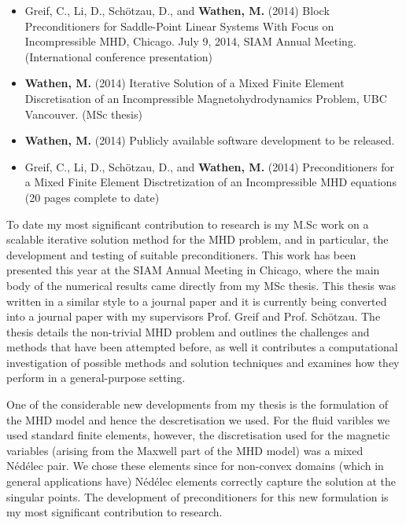 \documentclass[12pt]{article}
\numberwithin{equation}{section}    %
\newcommand{\nedelec}{N\'{e}d\'{e}lec }
\begin{document}
\medskip


\begin{itemize}
    \item Greif, C., Li, D., Sch{\"o}tzau, D., and {\bf Wathen, M.} (2014) Block Preconditioners for Saddle-Point Linear Systems With Focus on Incompressible MHD, Chicago. July 9, 2014, SIAM Annual Meeting. (International conference presentation)
    \item {\bf Wathen, M.} (2014) Iterative Solution of a Mixed Finite Element Discretisation of an Incompressible Magnetohydrodynamics Problem, UBC Vancouver. (MSc thesis)
    \item {\bf Wathen, M.} (2014) Publicly available software development to be released.
    \item Greif, C., Li, D., Sch{\"o}tzau, D., and {\bf Wathen, M.} (2014) Preconditioners for a Mixed Finite Element Disctretization of an Incompressible MHD equations (20 pages complete to date)
\end{itemize}



\medskip

To date my most significant contribution to research is my M.Sc work on a scalable iterative solution method for the MHD problem, and in particular, the development and testing of suitable preconditioners. This work has been presented this year at the SIAM Annual Meeting in Chicago, where the main body of the numerical results came directly from my MSc thesis. This thesis was written in a similar style to a journal paper and it is currently being converted into a journal paper with my supervisors Prof. Greif and Prof. Sch{\"o}tzau. The thesis details the non-trivial MHD problem and outlines the challenges and methods that have been attempted before, as well it contributes a computational investigation of possible methods and solution techniques and examines how they perform in a general-purpose setting.
\smallskip

One of the considerable new developments from my thesis is the formulation of the MHD model and hence the descretisation we used. For the fluid varibles we used standard finite elements, however, the discretisation used for the magnetic variables (arising from the Maxwell part of the MHD model) was a mixed \nedelec pair. We chose these elements since for non-convex domains (which in general applications have)  \nedelec elements correctly capture the solution at the singular points. The development of preconditioners for this new formulation is my most significant contribution to research.
\smallskip
\end{document}
